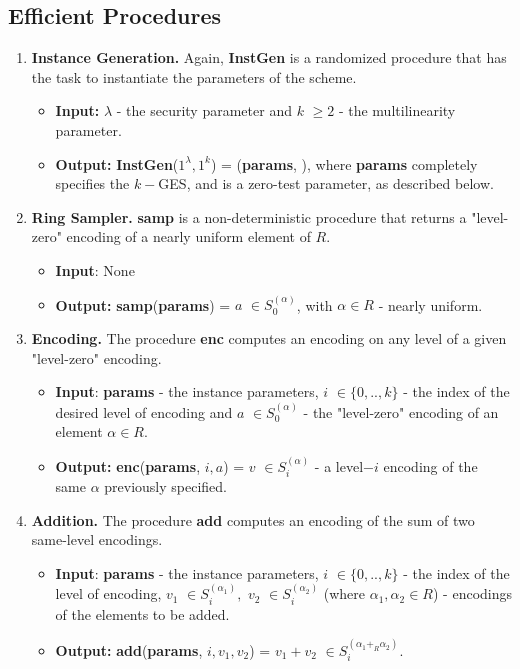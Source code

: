 \subsection{Efficient Procedures}
\begin{enumerate}[label=(\alph*)]
	\item \textbf{Instance Generation.}	 Again, \textbf{InstGen} is a randomized procedure that has the task to instantiate the parameters of the scheme.
	\begin{itemize}
		\item \textbf{Input:} {\boldmath$\lambda$} - the security parameter and {\boldmath$k$} $\geq 2$ - the multilinearity parameter.
		\item \textbf{Output:} \textbf{InstGen}($1^\lambda, 1^k$) = (\textbf{params}, \pzt), where \textbf{params} completely specifies the $k-$GES, and {\pzt}  is a zero-test parameter, as described below.
	\end{itemize}

	\item \textbf{Ring Sampler.} \textbf{samp} is a non-deterministic procedure that returns a "level-zero" encoding of a nearly uniform element of $R$.
		\begin{itemize}
		\item \textbf{Input}: None
		\item \textbf{Output:} \textbf{samp}(\textbf{params}) = {\boldmath$a$} $\in S_0^{(\alpha)}$, with $\alpha\in R$ - nearly uniform.
	\end{itemize}

	\item \textbf{Encoding.} The procedure \textbf{enc} computes an encoding on any level of a given "level-zero" encoding.
	\begin{itemize}
		\item \textbf{Input}: \textbf{params} - the instance parameters, {\boldmath$i$} $\in \{0,..,k\}$ - the index of the desired level of encoding and {\boldmath$a$} $\in S_0^{(\alpha)}$ - the "level-zero" encoding of an element $\alpha \in R$.
		\item \textbf{Output:} \textbf{enc}(\textbf{params}, $i, a$) = {\boldmath$v$} $\in S_i^{(\alpha)}$ - a level$-i$ encoding of the same $\alpha$ previously specified.
	\end{itemize}

	\item \textbf{Addition.} The procedure \textbf{add} computes an encoding of the sum of two same-level encodings.
	\begin{itemize}
		\item \textbf{Input}: \textbf{params} - the instance parameters, {\boldmath$i$} $\in \{0,..,k\}$ - the index of the level of encoding, {\boldmath$v_1$} $\in S_i^{(\alpha_1)},$ {\boldmath$v_2$} $\in S_i^{(\alpha_2)}$ (where $\alpha_1, \alpha_2\in R$) - encodings of the elements to be added.
		\item \textbf{Output:} \textbf{add}(\textbf{params}, $i, v_1, v_2$) = {\boldmath$ v_1 + v_2$} $ \in S_i^{(\alpha_1 +_R \alpha_2)}$.
	\end{itemize}


\end{enumerate}
